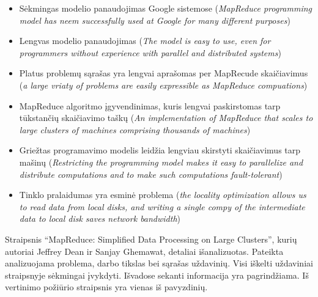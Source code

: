 \documentclass[10pt, onecolumn]{IEEEtran}
\begin{document}
		\begin{itemize}
	      \item Sėkmingas modelio panaudojimas Google sistemose (\textit{MapReduce programming model has neem successfully used at Google for many different purposes})
	      \item Lengvas modelio panaudojimas (\textit{The model is easy to use, even for programmers without experience with parallel and distributed systems})
	      \item Platus problemų sąrašas yra lengvai aprašomas per MapRecude skaičiavimus (\textit{a large vriaty of problems are easily expressible as MapReduce compuations})
	      \item MapReduce algoritmo įgyvendinimas, kuris lengvai paskirstomas tarp tūkstančių skaičiavimo taškų (\textit{An implementation of MapReduce that scales to large clusters of machines comprising thousands of machines})
	      \item Griežtas programavimo modelis leidžia lengviau skirstyti skaičiavimus tarp mašinų (\textit{Restricting the programming model makes it easy to parallelize and distribute computations and to make such computations fault-tolerant})
	      \item Tinklo pralaidumas yra esminė problema (\textit{the locality optimization allows us to read data from local disks, and writing a single compy of the intermediate data to local disk saves network bandwidth})
	    \end{itemize}

		Straipsnis ``MapReduce: Simplified Data Processing on Large Clusters'', kurių autoriai Jeffrey Dean ir Sanjay Ghemawat, detaliai išanalizuotas. Pateikta analizuojama problema, darbo tikslas bei sąrašas uždavinių. Visi iškelti uždaviniai straipsnyje sėkmingai įvykdyti. Išvadose sekanti informacija yra pagrindžiama. Iš vertinimo požiūrio straipsnis yra vienas iš pavyzdinių. 
\end{document}
